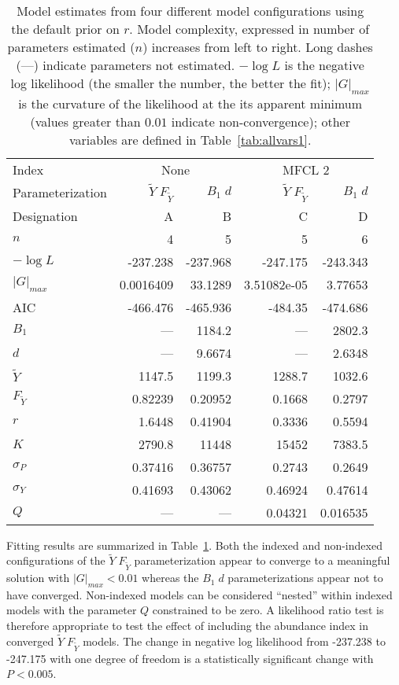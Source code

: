 \documentclass[12pt,letterpaper,twoside]{article}
\newcommand\MSY{\widetilde{Y}}
\newcommand\Fmsy{F_{\MSY}}
\newcommand\MSYFmsy{\MSY\;\Fmsy}
\newcommand\Bd{B_1\; d}
\begin{document}
\begin{table}
\caption{
Model estimates from four different model configurations using the
default prior on $r$.
Model complexity, expressed in number of parameters estimated ($n$)
increases from left to right. Long dashes (---) indicate parameters
not estimated. 
{%
$-\log L$ is the negative log likelihood (the smaller the number, the
better the fit);
$|G|_{max}$ is the curvature of the likelihood at the its apparent
minimum (values greater than $0.01$ indicate non-convergence);
other variables are defined in Table~\ref{tab:allvars1}.
}
\label{tag:ests4}}
\begin{center}
\begin{tabular}{|l|rr|rr|}
\hline
Index & \multicolumn{2}{c|}{None}&\multicolumn{2}{c|}{MFCL 2}\\
\cline{2-3}\cline{4-5}
Parameterization&$\MSYFmsy$&$\Bd$&$\MSYFmsy$&$\Bd$\\
Designation& A & B& C& D\\
\hline
\hline
$n$ & 4 & 5 & 5 & 6\\
$-\log L$ & -237.238 & -237.968 & -247.175 & -243.343\\
$|G|_{max}$ & 0.0016409 & 33.1289 & 3.51082e-05 & 3.77653\\
AIC & -466.476 & -465.936 & -484.35 & -474.686\\
\hline
$B_1$ & --- & 1184.2 & --- & 2802.3\\
$d$ & --- & 9.6674 & --- & 2.6348\\
$\MSY$ & 1147.5 & 1199.3 & 1288.7 & 1032.6\\
$\Fmsy$ & 0.82239 & 0.20952 & 0.1668 & 0.2797\\
$r$ & 1.6448 & 0.41904 & 0.3336 & 0.5594\\
$K$ & 2790.8 & 11448 & 15452 & 7383.5\\
$\sigma_P$ & 0.37416 & 0.36757 & 0.2743 & 0.2649\\
$\sigma_Y$ & 0.41693 & 0.43062 & 0.46924 & 0.47614\\
$Q$ & --- & --- & 0.04321 & 0.016535\\
\hline
\end{tabular}
\end{center}
\end{table}

Fitting results are summarized in Table~\ref{tag:ests4}.
Both the indexed and non-indexed configurations of the $\MSYFmsy$
parameterization
appear to converge to a meaningful solution with $|G|_{max}<0.01$
whereas the  $\Bd$ parameterizations appear not to have converged. 
Non-indexed models can be considered ``nested'' within indexed
models with the parameter $Q$ constrained to be zero. A likelihood
ratio test is therefore appropriate to test the effect of including
the abundance index in converged $\MSYFmsy$ models. 
The change in negative log likelihood
from -237.238 to -247.175 with one degree of freedom is a statistically
significant change with $P<0.005$.
\end{document}
